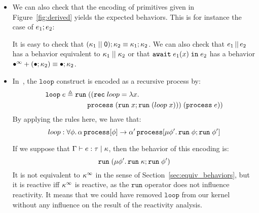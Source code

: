 \documentclass[9pt,preprint]{sigplanconf}
\newcommand{\deq}{\triangleq}
\begin{document}
\begin{itemize}
\item We can also check that the encoding of primitives given in Figure~\ref{fig:derived} yields the expected behaviors. This is for instance the case of $e_1 ; e_2$:
%
\par\nobreak{}%
It is easy to check that $(\kappa_1 \mid\mid \textsf{0}) ; \kappa_2  \equiv  \kappa_1 ; \kappa_2$.  We can also check that $e_1 \,||\, e_2$ has a behavior equivalent to $\kappa_1 \mid\mid \kappa_2$ or that $\mathtt{await}\; e_1(x) \;\mathtt{in}\; e_2$ has a behavior \mbox{$\bullet^\infty + (\bullet ; \kappa_2) \equiv \bullet ; \kappa_2$}. %

\item In~\cite{Mandel:2005}, the $\mathtt{loop}$ construct is encoded as a recursive process by:
%
\begin{align*}
\eloop{e} \deq &\mathid{run}(( \mathidl{rec} loop = 
     \elam{x}{ \\ &\qquad \eproc{(\eseq{\erun{x}}{\erun{(\eapp{loop}{x})}})}})\; (\eproc{e})) 
\end{align*}
%
By applying the rules here, we have that:
\[ loop: \forall \phi.\, \alpha \,\mathtt{process}[\phi] \rightarrow  \alpha' \,\mathtt{process}[\mu \phi'.\, \mathtt{run}\; \phi ; \mathtt{run}\; \phi'] \]
%

If we suppose that \mbox{$\Gamma \vdash e : \tau \mid \kappa$}, then the behavior of this encoding is: 
  \[ \mathtt{run}\; (\mu \phi'.\, \mathtt{run}\; \kappa ; \mathtt{run}\; \phi') \]
It is not equivalent to $\kappa^\infty$ in the sense of Section~\ref{sec:equiv_behaviors}, but it is reactive iff $\kappa^\infty$ is reactive, as the $\mathtt{run}$ operator does not influence reactivity. It means that we could have removed $\mathtt{loop}$ from our kernel without any influence on the result of the reactivity analysis.


\end{itemize}
\end{document}
